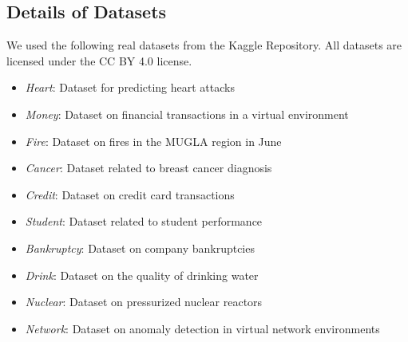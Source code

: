 \subsection{Details of  Datasets}
\label{app:appC3}
We used the following  real datasets from the Kaggle Repository. All datasets are licensed under the CC BY 4.0 license.

\begin{itemize}
  \item \textit{Heart}: Dataset for predicting heart attacks
  \item \textit{Money}: Dataset on financial transactions in a virtual environment
  \item \textit{Fire}: Dataset on fires in the MUGLA region in June
  \item \textit{Cancer}: Dataset related to breast cancer diagnosis
  \item \textit{Credit}: Dataset on credit card transactions
  \item \textit{Student}: Dataset related to student performance
  \item \textit{Bankruptcy}: Dataset on company bankruptcies
  \item \textit{Drink}: Dataset on the quality of drinking water
  \item \textit{Nuclear}: Dataset on pressurized nuclear reactors
  \item \textit{Network}: Dataset on anomaly detection in virtual network environments
\end{itemize}

%
\subsection{}
\label{app:appC4}


%
%
%

